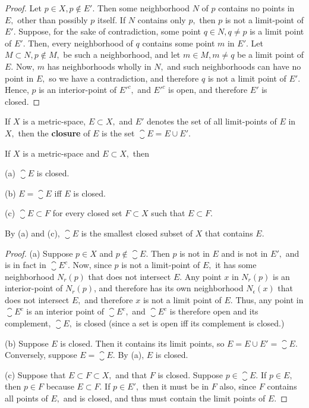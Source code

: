 \documentclass{article}
\begin{document}
\begin{proof}
Let $p \in X, p \notin E'.$ Then some \@{neighborhood} $N$ of $p$ contains no points in $E,$ other than possibly $p$ itself. If $N$ contains only $p,$ then $p$ is not a \@{limit-point} of $E'.$ Suppose, for the sake of contradiction, some point $q \in N, q \neq p$ is a limit point of $E'.$ Then, every neighborhood of $q$ contains some point $m$ in $E'.$ Let $M \subset N, p \notin M,$ be such a neighborhood, and let $m \in M, m \neq q$ be a limit point of $E$. Now, $m$ has neighborhoods wholly in $N,$ and such neighborhoods can have no point in $E,$ so we have a contradiction, and therefore $q$ is not a limit point of $E'.$ Hence, $p$ is an \@{interior-point} of $E'^c,$ and $E'^c$ is \@{open}, and therefore $E'$ is \@{closed}.
\end{proof}

\begin{definition}[Closure]
If $X$ is a \@{metric-space}, $E \subset X,$ and $E'$ denotes the set of all \@{limit-points} of $E$ in $X,$ then the \textbf{closure} of $E$ is the set $\closure{E} = E \cup E'.$
\end{definition}

\begin{theorem}\label{set-is-its-closure-iff-it-is-closed}
If $X$ is a \@{metric-space} and $E \subset X,$ then

(a) $\closure{E}$ is \@{closed}.

(b) $E = \closure{E}$ iff $E$ is closed.

(c) $\closure{E} \subset F$ for every closed set $F \subset X$ such that $E \subset F.$

By (a) and (c), $\closure{E}$ is the smallest closed subset of $X$ that contains $E.$
\end{theorem}

\begin{proof}
(a) Suppose $p \in X$ and $p \notin \closure{E}.$ Then $p$ is not in $E$ and is not in $E',$ and is in fact in $\closure{E}^c.$ Now, since $p$ is not a \@{limit-point} of $E,$ it has some \@{neighborhood} $N_r(p)$ that does not intersect $E.$ Any point $x$ in $N_r(p)$ is an \@{interior-point} of $N_r(p)$, and therefore has its own neighborhood $N_\epsilon{(x)}$ that does not intersect $E,$ and therefore $x$ is not a limit point of $E.$ Thus, any point in $\closure{E}^c$ is an interior point of $\closure{E}^c,$ and $\closure{E}^c$ is therefore \@{open} and its complement, $\closure{E},$ is \@{closed} (since a set is open iff its complement is closed.)

(b) Suppose $E$ is closed. Then it contains its limit points, so $E = E \cup E' = \closure{E}.$ Conversely, suppose $E = \closure{E}.$ By (a), $E$ is closed.

(c) Suppose that $E \subset F \subset X,$ and that $F$ is closed. Suppose $p \in \closure{E}.$ If $p \in E,$ then $p \in F$ because $E \subset F.$ If $p \in E',$ then it must be in $F$ also, since $F$ contains all points of $E,$ and is closed, and thus must contain the limit points of $E.$
\end{proof}
\end{document}
